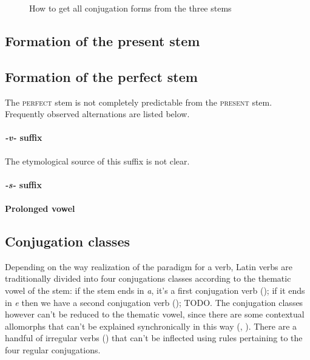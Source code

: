\documentclass[a4paper, oneside, 12pt]{report}
\newcommand{\form}[1]{\emph{#1}}
\newcommand*{\category}[1]{\textsc{#1}}
\begin{document}
\begin{figure}
    \centering
    {\small }
    \caption{How to get all conjugation forms from the three stems}
    \label{fig:stem-to-form}
\end{figure}

\subsection{Formation of the present stem}


\subsection{Formation of the perfect stem}\label{sec:verb-inflection.stem.perfect}

The \category{perfect} stem is not completely predictable from the \category{present} stem. 
Frequently observed alternations are listed below.

\paragraph*{\form{-v-} suffix} 
The etymological source of this suffix is not clear.

\paragraph*{\form{-s-} suffix}

\paragraph*{Prolonged vowel}

\subsection{Conjugation classes}\label{sec:verb-morphology.stem.conjugation}

Depending on the way realization of the paradigm for a verb,
Latin verbs are traditionally divided into 
four conjugations classes
according to the thematic vowel of the stem:
if the stem ends in \form{a}, 
it's a first conjugation verb ();
if it ends in \form{e} 
then we have a second conjugation verb ();
TODO.
The conjugation classes however can't be reduced to 
the thematic vowel, 
since there are some contextual allomorphs that can't be explained synchronically
in this way
(, ).
There are a handful of irregular verbs ()
that can't be inflected using rules pertaining to the four regular conjugations.
\end{document}

